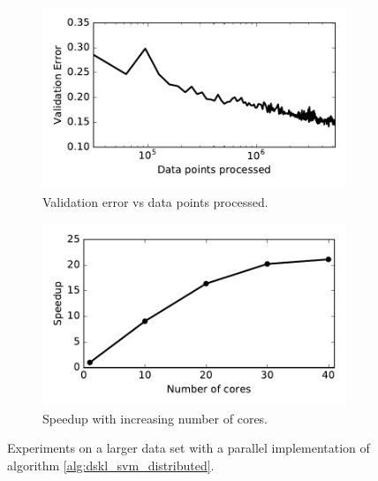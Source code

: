 \documentclass{article} %
\begin{document}
\begin{figure}[!ht]
	\begin{subfigure}[b]{0.45\textwidth}
		\centering
		\includegraphics[width=\textwidth]{imgs/covertype_validation.pdf}
		\caption{\centering Validation error vs data points processed.}
		\label{fig:covertype_validation}
	\end{subfigure}
  \hfill
	\begin{subfigure}[b]{0.45\textwidth}
		\centering
		\includegraphics[width=\textwidth]{imgs/speedup_240.pdf}
		\caption{\centering Speedup with increasing number of cores.}
		\label{fig:speedup_58}
	\end{subfigure}
	\caption{\label{fig:large-scale-experiments}Experiments on a larger data set with a parallel implementation of algorithm \autoref{alg:dskl_svm_distributed}. }
\end{figure}
%
\end{document}
